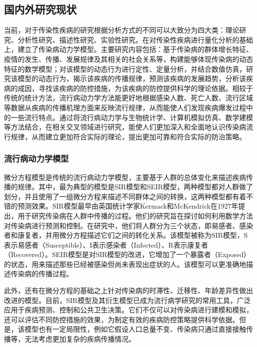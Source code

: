 \subsection{国内外研究现状}
当前，对于传染性疾病的研究根据分析方式的不同可以大致分为四大类：理论研究、分析性研究、描述性研究、实验性研究。在对传染性疾病进行量化分析的基础上，建立了传染病动力学模型。主要研究内容包括：基于传染病的群体增长特征、疫情的发生、传播、发展规律及其相关的社会关系等，构建能够体现传染病的动态特征的数学模型；对该模型的动态行为进行定性、定量分析，并结合数值仿真，研究该模型的动态行为，揭示该疾病的传播规律，预测该疾病的发展趋势，分析该疾病的成因，寻找该疾病的防控措施，为该疾病的防控提供科学的理论依据。相较于传统的统计方法，流行病动力学方法能更好地根据感染人数、死亡人数、流行区域等数据从疾病的传播机理方面来反映流行规律，从而能使人们发现疾病爆发过程中的一些流行特点。通过将流行病动力学与生物统计学、计算机模拟仿真、数学建模等方法结合，在相关交叉领域进行研究，能使人们更加深入和全面地认识传染病流行规律，从而建立更加符合实际的理论，提出更加可靠和符合实际的防治策略。

\subsubsection{流行病动力学模型}
微分方程模型是传统的流行病动力学模型，主要基于人群的总体变化来描述疾病传播的规律。其中，最为典型的模型是SIR模型和SEIR模型，两种模型都对人群做了划分，并且使用了一组微分方程来描述不同群体之间的转换，这两种模型都有着不错的预测效果。SIR模型最早由英国统计学家Kermack和McKendrick在1927年提出，用于研究传染病在人群中传播的过程。他们的研究旨在探讨如何利用数学方法对传染病进行预测和控制。在研究中，他们将人群分为三个状态，即易感者、感染者和康复者，并用微分方程描述它们之间的转化关系。该模型被称为SIR模型，S表示易感者（Susceptible）、I表示感染者（Infected）、R表示康复者（Recovered）。SEIR模型是对SIR模型的改进，它增加了一个暴露者（Exposed）的状态，用来描述那些已经被感染但尚未表现出症状的人。该模型可以更准确地描述传染病的传播过程。

此外，还有在微分方程的基础之上针对传染病的时滞性、迁移性、年龄差异性做出改进的模型。目前，SIR模型及其衍生模型已成为流行病学研究的常用工具，广泛应用于疾病预测、控制和公共卫生决策。它们不仅可以对传染病进行建模和模拟，还可以评估不同防控措施的效果，为制定有效的疾病防控策略提供科学依据。但是，该模型也有一定局限性，例如它假设人口总量不变、传染病只通过直接接触传播等，无法考虑更加复杂的疾病传播情况。

